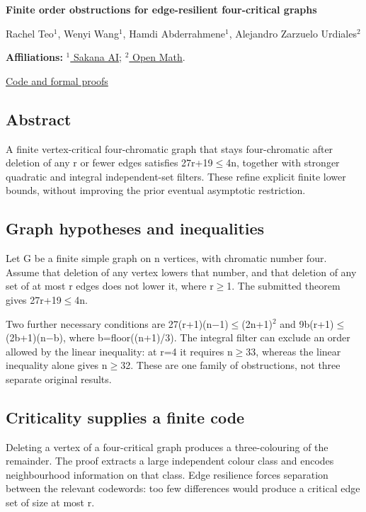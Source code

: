 \documentclass[11pt,a4paper]{article}
\begin{document}
{\LARGE\bfseries Finite order obstructions for edge-resilient four-critical graphs\par}\medskip
{\small Rachel Teo\ensuremath{^1}, Wenyi Wang\ensuremath{^1}, Hamdi Abderrahmene\ensuremath{^1}, Alejandro Zarzuelo Urdiales\ensuremath{^2}\par}\medskip
{\small\textbf{Affiliations:} \href{https://sakana.ai/}{\ensuremath{^1} Sakana AI}; \href{https://rsihouse.ai/openmath}{\ensuremath{^2} Open Math}.\par}

{\small\href{https://github.com/alejandrozu/openmath-2026-judging}{Code and formal proofs}\par}

\subsection{Abstract}
A finite vertex-critical four-chromatic graph that stays four-chromatic after deletion of any r or fewer edges satisfies 27r+19\ensuremath{\leq}4n, together with stronger quadratic and integral independent-set filters. These refine explicit finite lower bounds, without improving the prior eventual asymptotic restriction.

\subsection{Graph hypotheses and inequalities}
Let G be a finite simple graph on n vertices, with chromatic number four. Assume that deletion of any vertex lowers that number, and that deletion of any set of at most r edges does not lower it, where r\ensuremath{\geq}1. The submitted theorem gives 27r+19\ensuremath{\leq}4n.

Two further necessary conditions are 27(r+1)(n\ensuremath{-}1)\ensuremath{\leq}(2n+1)\ensuremath{^2} and 9b(r+1)\ensuremath{\leq}(2b+1)(n\ensuremath{-}b), where b=floor((n+1)/3). The integral filter can exclude an order allowed by the linear inequality: at r=4 it requires n\ensuremath{\geq}33, whereas the linear inequality alone gives n\ensuremath{\geq}32. These are one family of obstructions, not three separate original results.

\subsection{Criticality supplies a finite code}
Deleting a vertex of a four-critical graph produces a three-colouring of the remainder. The proof extracts a large independent colour class and encodes neighbourhood information on that class. Edge resilience forces separation between the relevant codewords: too few differences would produce a critical edge set of size at most r.
\end{document}
